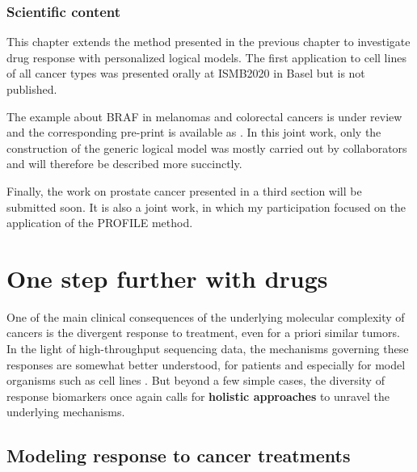\documentclass[a4paper,12pt,twoside,onecolumn,openright,final,oldfontcommands]{memoir}
\let\BeginKnitrBlock\begin \let\EndKnitrBlock\end
\begin{document}
\BeginKnitrBlock{summarybox}
\subsubsection*{Scientific content}\label{scientific-content-3}

This chapter extends the method presented in the previous chapter to
investigate drug response with personalized logical models. The first
application to cell lines of all cancer types was presented orally at
ISMB2020 in Basel but is not published.

The example about BRAF in melanomas and colorectal cancers is under
review and the corresponding pre-print is available as
\citet{beal2020personalized}. In this joint work, only the construction
of the generic logical model was mostly carried out by collaborators and
will therefore be described more succinctly.

Finally, the work on prostate cancer presented in a third section will
be submitted soon. It is also a joint work, in which my participation
focused on the application of the PROFILE method.
\EndKnitrBlock{summarybox}

\section{One step further with drugs}\label{one-step-further-with-drugs}

One of the main clinical consequences of the underlying molecular
complexity of cancers is the divergent response to treatment, even for a
priori similar tumors. In the light of high-throughput sequencing data,
the mechanisms governing these responses are somewhat better understood,
for patients and especially for model organisms such as cell lines
\citep{heiser2012subtype, garnett2012systematic}. But beyond a few
simple cases, the diversity of response biomarkers once again calls for
\textbf{holistic approaches} to unravel the underlying mechanisms.

\subsection{Modeling response to cancer
treatments}\label{modeling-response-to-cancer-treatments}
\end{document}
